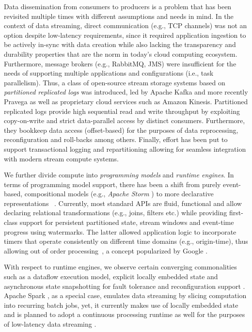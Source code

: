 Data dissemination from consumers to producers is a problem that has been revisited multiple times with different assumptions and needs in mind. In the context of data streaming, direct communication (e.g., TCP channels) was not an option despite low-latency requirements, since it required application ingestion to be actively in-sync with data creation while also lacking the transparency and durability properties that are the norm in today's cloud computing ecosystem. Furthermore, message brokers (e.g., RabbitMQ, JMS) were insufficient for the needs of supporting multiple applications and configurations (i.e., task parallelism). Thus, a class of open-source stream storage systems based on \emph{partitioned replicated logs} was introduced, led by Apache Kafka \cite{kreps2011kafka} and more recently Pravega \cite{CUSTOM:web/pravega} as well as proprietary cloud services such as Amazon Kinesis. Partitioned replicated logs provide high sequential read and write throughput by exploiting copy-on-write and strict data-parallel access by distinct consumers. Furthermore, they bookkeep data access (offset-based) for the purposes of data reprocessing, reconfiguration and roll-backs among others. Finally, effort has been put to support transactional logging and repartitioning allowing for seamless integration with modern stream compute systems.

 We further divide compute into \emph{programming models} and \emph{runtime engines}. In terms of programming model support, there has been a shift from purely event-based, compositional models (e.g., \emph{Apache Storm} \cite{CUSTOM:web/Storm}) to more declarative representations ~\cite{carbone_et_al_2015,akidau2015dataflow,CUSTOM:web/apex,zaharia_et_al_2013,CUSTOM:web/kafkastreams}. Currently, most standard APIs are fluid, functional and allow declaring relational transformations (e.g., joins, filters etc.) while providing first-class support for persistent partitioned state, stream windows and event-time progress using watermarks. The latter allowed application logic to incorporate timers that operate consistently on different time domains (e.g., origin-time), thus allowing out of order processing~\cite{li2008out},  a concept popularized by Google \cite{millwheel,akidau2015dataflow}. 

With respect to runtime engines, we observe certain converging commonalities such as a dataflow execution model, explicit locally embedded state and asynchronous state snapshotting for fault tolerance and reconfiguration support \cite{state2017carbone,jacques2016consistent}. Apache Spark \cite{zaharia_et_al_2013}, as a special case, emulates data streaming by slicing computation into recurring batch jobs, yet, it currently makes use of locally embedded state and is planned to adopt a continuous processing runtime as well for the purposes of low-latency data streaming \cite{CUSTOM:web/sparkcontinuous}.

